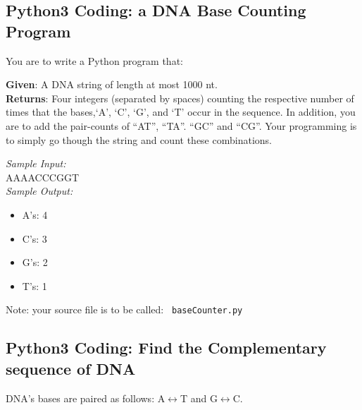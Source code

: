 \subsection*{Python3 Coding: a DNA Base Counting Program}
\vspace*{-.1in} 

You are to write a Python program that:

\noindent \textbf{Given}: A DNA string of length at most 1000 nt. \\ 
\textbf{Returns}: Four integers (separated by spaces) counting the respective number of times that the bases,`A', `C', `G', and `T' occur in the sequence. In addition, you are to add the pair-counts of ``AT'', ``TA''. ``GC'' and ``CG''. Your programming is to simply go though the string and count these combinations. 

\emph{Sample Input: } \\
AAAACCCGGT \\

\emph{Sample Output: } \\
	\begin{itemize}
	
	\item A's: 4 
  	\item C's: 3
  	\item G's: 2
  	\item T's: 1
\end{itemize}

\noindent
Note: your source file is to be called: {\tt \color{red} baseCounter.py\color{black}}




\vspace*{-.1in}
\subsection*{Python3 Coding: Find the Complementary sequence of DNA}
\vspace*{-.1in} 
DNA's bases are paired as follows: A$\leftrightarrow $T and G$\leftrightarrow $C. 

